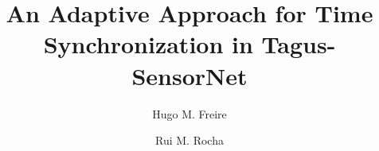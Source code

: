 \documentclass[preprint,12pt]{elsarticle}
\begin{document}
\begin{frontmatter}

\title{An Adaptive Approach for Time Synchronization in Tagus-SensorNet}
\author[ist]{Hugo M. Freire}
\author[it]{Rui M. Rocha}
\address[ist]{Instituto Superior Técnico - Taguspark, Av. Prof. Dr. Aníbal Cavaco Silva, 2744-016 Porto Salvo, Portugal}
\address[it]{Instituto de Telecomunicações, Instituto Superior Técnico, Torre Norte, piso 10, Av. Rovisco Pais, 1, P-1049-001 Lisboa, Portugal}

\begin{abstract}

\end{abstract}

\begin{keyword}

\end{keyword}

\end{frontmatter}







\end{document}
